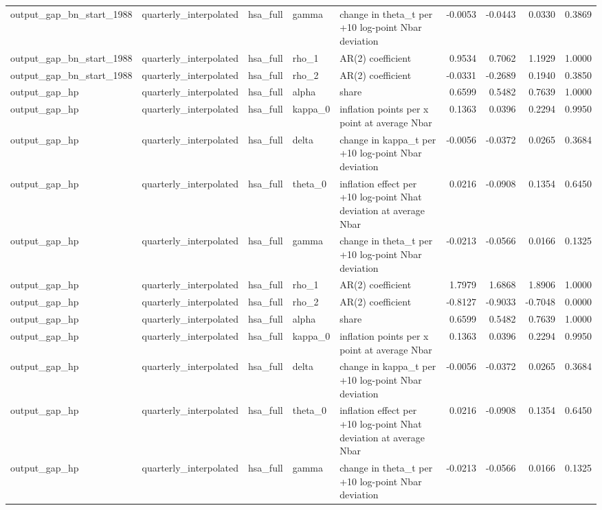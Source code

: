 \begin{tabular}{lllllrrrr}
output\_gap\_bn\_start\_1988 & quarterly\_interpolated & hsa\_full & gamma & change in theta\_t per +10 log-point Nbar deviation & -0.0053 & -0.0443 & 0.0330 & 0.3869 \\
output\_gap\_bn\_start\_1988 & quarterly\_interpolated & hsa\_full & rho\_1 & AR(2) coefficient & 0.9534 & 0.7062 & 1.1929 & 1.0000 \\
output\_gap\_bn\_start\_1988 & quarterly\_interpolated & hsa\_full & rho\_2 & AR(2) coefficient & -0.0331 & -0.2689 & 0.1940 & 0.3850 \\
output\_gap\_hp & quarterly\_interpolated & hsa\_full & alpha & share & 0.6599 & 0.5482 & 0.7639 & 1.0000 \\
output\_gap\_hp & quarterly\_interpolated & hsa\_full & kappa\_0 & inflation points per x point at average Nbar & 0.1363 & 0.0396 & 0.2294 & 0.9950 \\
output\_gap\_hp & quarterly\_interpolated & hsa\_full & delta & change in kappa\_t per +10 log-point Nbar deviation & -0.0056 & -0.0372 & 0.0265 & 0.3684 \\
output\_gap\_hp & quarterly\_interpolated & hsa\_full & theta\_0 & inflation effect per +10 log-point Nhat deviation at average Nbar & 0.0216 & -0.0908 & 0.1354 & 0.6450 \\
output\_gap\_hp & quarterly\_interpolated & hsa\_full & gamma & change in theta\_t per +10 log-point Nbar deviation & -0.0213 & -0.0566 & 0.0166 & 0.1325 \\
output\_gap\_hp & quarterly\_interpolated & hsa\_full & rho\_1 & AR(2) coefficient & 1.7979 & 1.6868 & 1.8906 & 1.0000 \\
output\_gap\_hp & quarterly\_interpolated & hsa\_full & rho\_2 & AR(2) coefficient & -0.8127 & -0.9033 & -0.7048 & 0.0000 \\
output\_gap\_hp & quarterly\_interpolated & hsa\_full & alpha & share & 0.6599 & 0.5482 & 0.7639 & 1.0000 \\
output\_gap\_hp & quarterly\_interpolated & hsa\_full & kappa\_0 & inflation points per x point at average Nbar & 0.1363 & 0.0396 & 0.2294 & 0.9950 \\
output\_gap\_hp & quarterly\_interpolated & hsa\_full & delta & change in kappa\_t per +10 log-point Nbar deviation & -0.0056 & -0.0372 & 0.0265 & 0.3684 \\
output\_gap\_hp & quarterly\_interpolated & hsa\_full & theta\_0 & inflation effect per +10 log-point Nhat deviation at average Nbar & 0.0216 & -0.0908 & 0.1354 & 0.6450 \\
output\_gap\_hp & quarterly\_interpolated & hsa\_full & gamma & change in theta\_t per +10 log-point Nbar deviation & -0.0213 & -0.0566 & 0.0166 & 0.1325 \\

\end{tabular}

